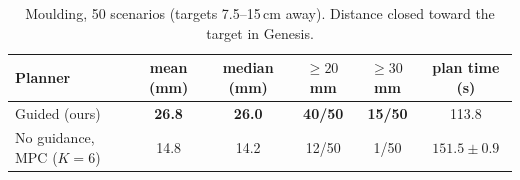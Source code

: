 \begin{table}[t]
\centering
\small
\caption{Moulding, 50 scenarios (targets 7.5--15\,cm away). Distance closed toward the target in Genesis.}
\label{tab:mould-results}
\begin{tabular}{lccccc}
\toprule
Planner & mean (mm) & median (mm) & $\ge 20$\,mm & $\ge 30$\,mm & plan time (s) \\
\midrule
Guided (ours) & \textbf{26.8} & \textbf{26.0} & \textbf{40/50} & \textbf{15/50} & 113.8 \\
No guidance, MPC ($K = 6$) & 14.8 & 14.2 & 12/50 & 1/50 & $151.5 \pm 0.9$ \\
\bottomrule
\end{tabular}
\end{table}
